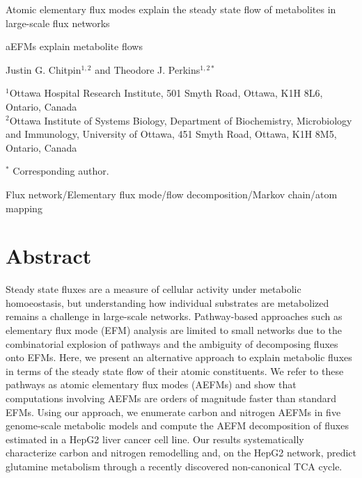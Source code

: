 \documentclass[12pt]{article}
\begin{document}
\begin{titlepage}
    \begin{center}
        \vspace*{1cm}

        Atomic elementary flux modes explain the steady state flow of
        metabolites in large-scale flux networks

        \vspace{1.0cm}
        aEFMs explain metabolite flows
            
        \vspace{1.0cm}

        Justin G. Chitpin$^{1,2}$ and Theodore J. Perkins$^{1,2*}$

        \vspace{1.0cm}

        $^1$Ottawa Hospital Research Institute, 501 Smyth Road, Ottawa, K1H 8L6, Ontario, Canada\\
        $^2$Ottawa Institute of Systems Biology, Department of Biochemistry, Microbiology and Immunology, University of Ottawa, 451 Smyth Road, Ottawa, K1H 8M5, Ontario, Canada
           
        \vspace{0.5cm}

        $^*$ Corresponding author.

        \vspace{1.0cm}
     
        Flux network/Elementary flux mode/flow decomposition/Markov chain/atom mapping
            
   \end{center}
\end{titlepage}

\clearpage

\section*{Abstract} %

Steady state fluxes are a measure of cellular activity under metabolic homoeostasis, but understanding how individual substrates are metabolized remains a challenge in large-scale networks. 
Pathway-based approaches such as elementary flux mode (EFM) analysis are limited to small networks due to the combinatorial explosion of pathways and the ambiguity of decomposing fluxes onto EFMs. 
Here, we present an alternative approach to explain metabolic fluxes in terms of the steady state flow of their atomic constituents. 
We refer to these pathways as atomic elementary flux modes (AEFMs) and show that computations involving AEFMs are orders of magnitude faster than standard EFMs. %
Using our approach, we enumerate carbon and nitrogen AEFMs in five genome-scale metabolic models and compute the AEFM decomposition of fluxes estimated in a HepG2 liver cancer cell line.
Our results systematically characterize carbon and nitrogen remodelling and, on the HepG2 network, predict glutamine
metabolism through a recently discovered non-canonical TCA cycle. 
\end{document}
